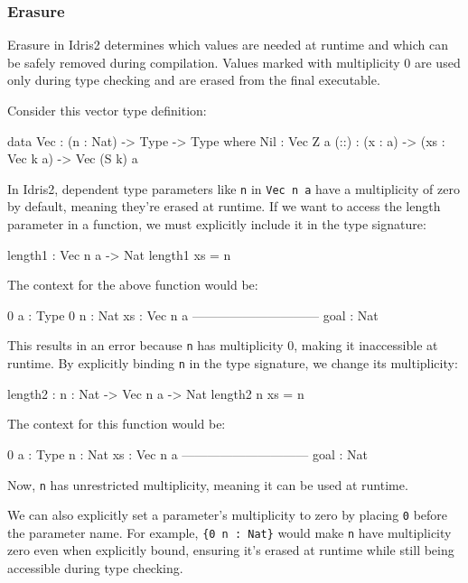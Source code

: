 \documentclass[]{rptuseminar}
\begin{document}
\subsubsection{Erasure}
Erasure in Idris2 determines which values are needed at runtime and which can be safely removed during compilation. Values marked with multiplicity 0 are used only during type checking and are erased from the final executable.

Consider this vector type definition:

\begin{idris}
data Vec : (n : Nat) -> Type -> Type where
    Nil : Vec Z a
    (::) : (x : a) -> (xs : Vec k a) -> Vec (S k) a
\end{idris}

In Idris2, dependent type parameters like \texttt{n} in \texttt{Vec n a} have a multiplicity of zero by default, meaning they're erased at runtime. If we want to access the length parameter in a function, we must explicitly include it in the type signature:

\begin{idris}
length1 : Vec n a -> Nat
length1 xs = n
\end{idris}

The context for the above function would be:
\begin{idris}
0 a : Type
0 n : Nat
xs : Vec n a
------------------------------
goal : Nat
\end{idris}
This results in an error because \texttt{n} has multiplicity 0, making it inaccessible at runtime. By explicitly binding \texttt{n} in the type signature, we change its multiplicity:

\begin{idris}
length2 : {n : Nat} -> Vec n a -> Nat
length2 {n} xs = n
\end{idris}

The context for this function would be:
\begin{idris}
0 a : Type
n : Nat
xs : Vec n a
------------------------------
goal : Nat
\end{idris}
Now, \texttt{n} has unrestricted multiplicity, meaning it can be used at runtime.

We can also explicitly set a parameter's multiplicity to zero by placing \texttt{0} before the parameter name. For example, \texttt{\{0 n : Nat\}} would make \texttt{n} have multiplicity zero even when explicitly bound, ensuring it's erased at runtime while still being accessible during type checking.
\end{document}

